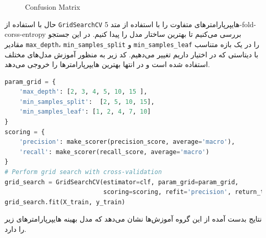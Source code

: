 \documentclass{article}
\begin{document}
\begin{figure}[H] 
	\centering
	\caption{Confusion Matrix}
	\label{fig: Q3 basic cm}
\end{figure}

حال با استفاده از 
\texttt{GridSearchCV}
هایپرپارامتر‌های متفاوت را با استفاده از متد
5-fold-corss-entropy
بررسی می‌کنیم تا بهترین ساختار مدل را پیدا کنیم. در این جستجو مقادیر
\texttt{max\_depth}، \texttt{min\_samples\_split} و \texttt{min\_samples\_leaf}
را در یک بازه متناسب با دیتاستی که در اختیار داریم تغییر می‌دهیم. کد زیر به منظور آموزش مدل‌های مختلف استفاده شده است و در انتها بهترین هایپرپارامترها را خروجی می‌دهد.
\begin{LTR}
	\begin{lstlisting}[language=Python, caption=Grid search]
param_grid = {
    'max_depth': [2, 3, 4, 5, 10, 15 ],
    'min_samples_split':  [2, 5, 10, 15],
    'min_samples_leaf': [1, 2, 4, 7, 10]
}
scoring = {
    'precision': make_scorer(precision_score, average='macro'),
    'recall': make_scorer(recall_score, average='macro')
}
# Perform grid search with cross-validation
grid_search = GridSearchCV(estimator=clf, param_grid=param_grid,
                           scoring=scoring, refit='precision', return_train_score=True)
grid_search.fit(X_train, y_train)
	\end{lstlisting}
\end{LTR}

نتایج بدست آمده از این گروه آموزش‌ها نشان می‌دهد که مدل بهینه هایپرپارامتر‌های زیر را دارد.
\end{document}
